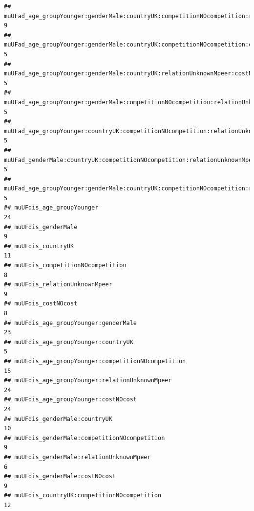 \documentclass[
]{article}
\begin{document}
\begin{verbatim}
## muUFad_age_groupYounger:genderMale:countryUK:competitionNOcompetition:relationUnknownMpeer                    9
## muUFad_age_groupYounger:genderMale:countryUK:competitionNOcompetition:costNOcost                              5
## muUFad_age_groupYounger:genderMale:countryUK:relationUnknownMpeer:costNOcost                                  5
## muUFad_age_groupYounger:genderMale:competitionNOcompetition:relationUnknownMpeer:costNOcost                   5
## muUFad_age_groupYounger:countryUK:competitionNOcompetition:relationUnknownMpeer:costNOcost                    5
## muUFad_genderMale:countryUK:competitionNOcompetition:relationUnknownMpeer:costNOcost                          5
## muUFad_age_groupYounger:genderMale:countryUK:competitionNOcompetition:relationUnknownMpeer:costNOcost         5
## muUFdis_age_groupYounger                                                                                     24
## muUFdis_genderMale                                                                                            9
## muUFdis_countryUK                                                                                            11
## muUFdis_competitionNOcompetition                                                                              8
## muUFdis_relationUnknownMpeer                                                                                  9
## muUFdis_costNOcost                                                                                            8
## muUFdis_age_groupYounger:genderMale                                                                          23
## muUFdis_age_groupYounger:countryUK                                                                            5
## muUFdis_age_groupYounger:competitionNOcompetition                                                            15
## muUFdis_age_groupYounger:relationUnknownMpeer                                                                24
## muUFdis_age_groupYounger:costNOcost                                                                          24
## muUFdis_genderMale:countryUK                                                                                 10
## muUFdis_genderMale:competitionNOcompetition                                                                   9
## muUFdis_genderMale:relationUnknownMpeer                                                                       6
## muUFdis_genderMale:costNOcost                                                                                 9
## muUFdis_countryUK:competitionNOcompetition                                                                   12

\end{verbatim}
\end{document}

